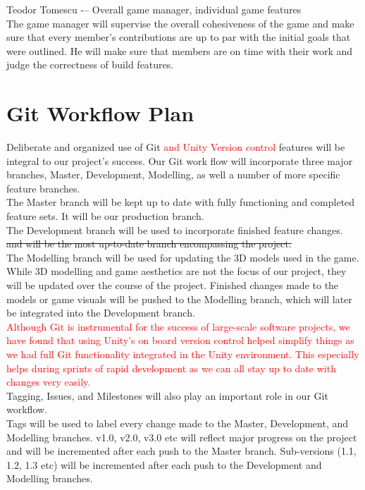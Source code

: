 \documentclass{article}
\begin{document}
Teodor Tomescu -– Overall game manager, individual game features\\

The game manager will supervise the overall cohesiveness of the game and make sure that every member’s contributions are up to par with the initial goals that were outlined. He will make sure that members are on time with their work and judge the correctness of build features.


\section{Git Workflow Plan}


Deliberate and organized use of Git \textcolor{red}{and Unity Version control} features will be integral to our project's success. Our Git work flow will incorporate three major branches, Master, Development, Modelling, as well a number of more specific feature branches. \\

The Master branch will be kept up to date with fully functioning and completed feature sets. It will be our production branch. \\

The Development branch will be used to incorporate finished feature changes. \st{and will be the most up-to-date branch encompassing the project.} \\

The Modelling branch will be used for updating the 3D models used in the game. While 3D modelling and game aesthetics are not the focus of our project, they will be updated over the course of the project. Finished changes made to the models or game visuals will be pushed to the Modelling branch, which will later be integrated into the Development branch. \\

\textcolor{red} {Although Git is instrumental for the success of large-scale software projects, we have found that using Unity's on board version control helped simplify things as we had full Git functionality  integrated in the Unity environment. This especially helps during sprints of rapid development as we can all stay up to date with changes very easily.}
\\

Tagging, Issues, and Milestones will also play an important role in our Git workflow. \\

Tags will be used to label every change made to the Master, Development, and Modelling branches. v1.0, v2.0, v3.0 etc will reflect major progress on the project and will be incremented after each push to the Master branch. Sub-versions (1.1, 1.2, 1.3 etc) will be incremented after each push to the Development and Modelling branches. \\
\end{document}
